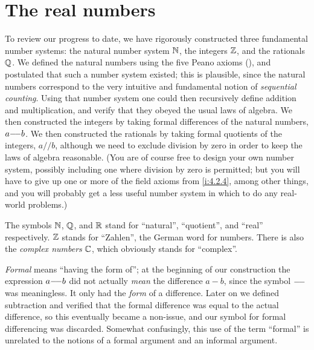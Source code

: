 \chapter{The real numbers}\label{i:ch:5}

\begin{note}
  To review our progress to date, we have rigorously constructed three fundamental number systems:
  the natural number system \(\mathbb{N}\), the integers \(\mathbb{Z}\), and the rationals \(\mathbb{Q}\).
  We defined the natural numbers using the five Peano axioms (), and postulated that such a number system existed;
  this is plausible, since the natural numbers correspond to the very intuitive and fundamental notion of \emph{sequential counting}.
  Using that number system one could then recursively define addition and multiplication, and verify that they obeyed the usual laws of algebra.
  We then constructed the integers by taking formal differences of the natural numbers, \(a {-}\!{-} b\).
  We then constructed the rationals by taking formal quotients of the integers, \(a // b\), although we need to exclude division by zero in order to keep the laws of algebra reasonable.
  (You are of course free to design your own number system, possibly including one where division by zero is permitted;
  but you will have to give up one or more of the field axioms from \cref{i:4.2.4}, among other things, and you will probably get a less useful number system in which to do any real-world problems.)
\end{note}

\begin{note}
  The symbols \(\mathbb{N}\), \(\mathbb{Q}\), and \(\mathbb{R}\) stand for ``natural'', ``quotient'', and ``real'' respectively.
  \(\mathbb{Z}\) stands for ``Zahlen'', the German word for numbers.
  There is also the \emph{complex numbers} \(\mathbb{C}\), which obviously stands for ``complex''.
\end{note}

\begin{note}
  \emph{Formal} means ``having the form of'';
  at the beginning of our construction the expression \(a {-}\!{-} b\) did not actually \emph{mean} the difference \(a - b\), since the symbol \({-}\!{-}\) was meaningless.
  It only had the \emph{form} of a difference.
  Later on we defined subtraction and verified that the formal difference was equal to the actual difference, so this eventually became a non-issue, and our symbol for formal differencing was discarded.
  Somewhat confusingly, this use of the term ``formal'' is unrelated to the notions of a formal argument and an informal argument.
\end{note}

